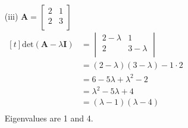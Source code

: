 \documentclass[letterpaper,fleqn]{article}
\begin{document}
{{\begin{enumerate}[(a)]
\begin{enumerate}
					
					\item [(iii)]
					$\textbf{A}=\begin{bmatrix}
						2 & 1 \\
						2 & 3 \\
					\end{bmatrix}$ \\
					$\begin{aligned}[t]
						\text{det}(\textbf{A}-\lambda\textbf{I}) &= \begin{vmatrix}
							2-\lambda & 1 \\
							2 & 3-\lambda \\
						\end{vmatrix} \\
						&= (2-\lambda)(3-\lambda)-1\cdot2 \\
						&= 6-5\lambda+\lambda^2-2\\
						&= \lambda^2-5\lambda+4 \\
						&= (\lambda-1)(\lambda-4) \\
					\end{aligned}$ \\
					Eigenvalues are 1 and 4.
				\end{enumerate}
			\end{enumerate}
		}
	}
\end{document}
